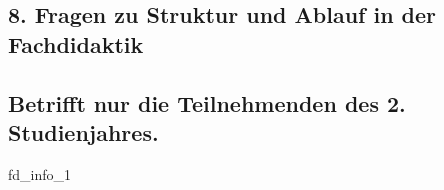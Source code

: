 \documentclass[a4paper,10pt]{article}
\makeatletter
\def\saveenum{\xdef\@savedenum{\the\c@enumi\relax}}
\makeatother
\begin{document}
{\begin{enumerate}
\end{enumerate} \saveenum

\vspace{-1cm}


\pagebreak


\subsection*{8. Fragen zu Struktur und Ablauf in der Fachdidaktik \\ \\
\small{Betrifft nur die Teilnehmenden des 2. Studienjahres.}}

\vspace{1cm}

\begin{questionmult}{fd_info_1}
	\begin{choices}
	\end{choices}
\end{questionmult}

\vspace{-1cm}


 \\

\begin{enumerate}


\end{enumerate}}
\end{document}
